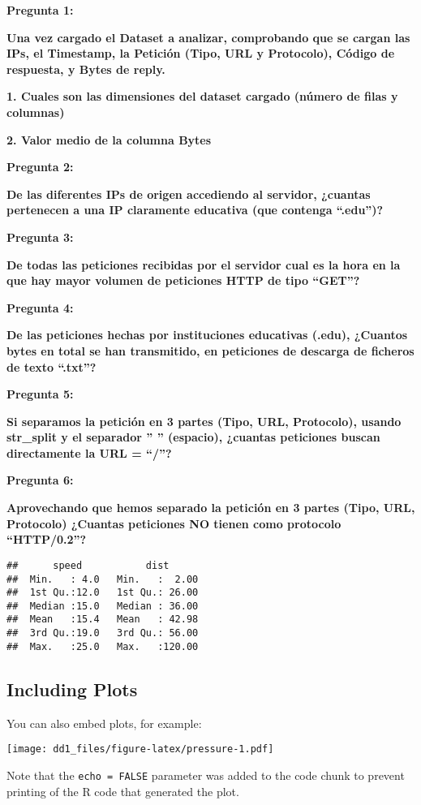 \documentclass[
]{article}
\begin{document}
\textbf{Pregunta 1:}

\textbf{Una vez cargado el Dataset a analizar, comprobando que se cargan
las IPs, el Timestamp, la Petición (Tipo, URL y Protocolo), Código de
respuesta, y Bytes de reply.}

\textbf{1. Cuales son las dimensiones del dataset cargado (número de
filas y columnas)}

\textbf{2. Valor medio de la columna Bytes}

\textbf{Pregunta 2:}

\textbf{De las diferentes IPs de origen accediendo al servidor, ¿cuantas
pertenecen a una IP claramente educativa (que contenga ``.edu'')?}

\textbf{Pregunta 3:}

\textbf{De todas las peticiones recibidas por el servidor cual es la
hora en la que hay mayor volumen de peticiones HTTP de tipo ``GET''?}

\textbf{Pregunta 4:}

\textbf{De las peticiones hechas por instituciones educativas (.edu),
¿Cuantos bytes en total se han transmitido, en peticiones de descarga de
ficheros de texto ``.txt''?}

\textbf{Pregunta 5:}

\textbf{Si separamos la petición en 3 partes (Tipo, URL, Protocolo),
usando str\_split y el separador '' '' (espacio), ¿cuantas peticiones
buscan directamente la URL = ``/''?}

\textbf{Pregunta 6:}

\textbf{Aprovechando que hemos separado la petición en 3 partes (Tipo,
URL, Protocolo) ¿Cuantas peticiones NO tienen como protocolo
``HTTP/0.2''?}

\begin{verbatim}
##      speed           dist       
##  Min.   : 4.0   Min.   :  2.00  
##  1st Qu.:12.0   1st Qu.: 26.00  
##  Median :15.0   Median : 36.00  
##  Mean   :15.4   Mean   : 42.98  
##  3rd Qu.:19.0   3rd Qu.: 56.00  
##  Max.   :25.0   Max.   :120.00
\end{verbatim}

\hypertarget{including-plots}{%
\subsection{Including Plots}\label{including-plots}}

You can also embed plots, for example:

\texttt{[image: dd1\_files/figure-latex/pressure-1.pdf]}

Note that the \texttt{echo\ =\ FALSE} parameter was added to the code
chunk to prevent printing of the R code that generated the plot.
\end{document}
